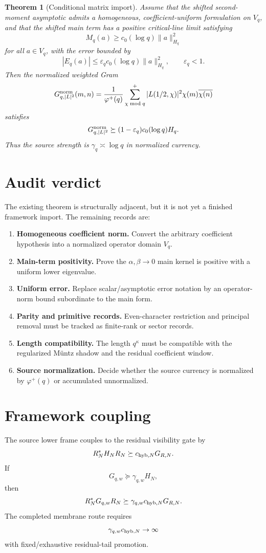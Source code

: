 \documentclass[11pt]{article}
\newtheorem{theorem}{Theorem}
\begin{document}
\begin{theorem}[Conditional matrix import]
Assume that the shifted second-moment asymptotic admits a homogeneous, coefficient-uniform formulation on
$V_q$, and that the shifted main term has a positive critical-line limit satisfying
\[
M_q(a)\ge c_0(\log q)\|a\|_{H_q}^2
\]
for all $a\in V_q$, with the error bounded by
\[
|E_q(a)|\le \varepsilon_q c_0(\log q)\|a\|_{H_q}^2,
\qquad \varepsilon_q<1.
\]
Then the normalized weighted Gram
\[
G_{q,|L|^2}^{\rm norm}(m,n)
=\frac1{\varphi^+(q)}\sum_{\chi\bmod q}^{+}|L(1/2,\chi)|^2\chi(m)\overline{\chi(n)}
\]
satisfies
\[
G_{q,|L|^2}^{\rm norm}\succeq (1-\varepsilon_q)c_0(\log q)H_q.
\]
Thus the source strength is $\gamma_q\asymp\log q$ in normalized currency.
\end{theorem}

\section{Audit verdict}
The existing theorem is structurally adjacent, but it is not yet a finished framework import. The remaining
records are:
\begin{enumerate}[label=\textbf{R\arabic*.}]
\item \textbf{Homogeneous coefficient norm.} Convert the arbitrary coefficient hypothesis into a normalized operator domain $V_q$.
\item \textbf{Main-term positivity.} Prove the $\alpha,\beta\to0$ main kernel is positive with a uniform lower eigenvalue.
\item \textbf{Uniform error.} Replace scalar/asymptotic error notation by an operator-norm bound subordinate to the main form.
\item \textbf{Parity and primitive records.} Even-character restriction and principal removal must be tracked as finite-rank or sector records.
\item \textbf{Length compatibility.} The length $q^\kappa$ must be compatible with the regularized Müntz shadow and the residual coefficient window.
\item \textbf{Source normalization.} Decide whether the source currency is normalized by $\varphi^+(q)$ or accumulated unnormalized.
\end{enumerate}

\section{Framework coupling}
The source lower frame couples to the residual visibility gate by
\[
R_N^*H_NR_N\succeq c_{{\rm hyb},N}G_{R,N}.
\]
If
\[
G_{q,w}\succeq\gamma_{q,w}H_N,
\]
then
\[
R_N^*G_{q,w}R_N\succeq \gamma_{q,w}c_{{\rm hyb},N}G_{R,N}.
\]
The completed membrane route requires
\[
\gamma_{q,w}c_{{\rm hyb},N}\to\infty
\]
with fixed/exhaustive residual-tail promotion.
\end{document}
